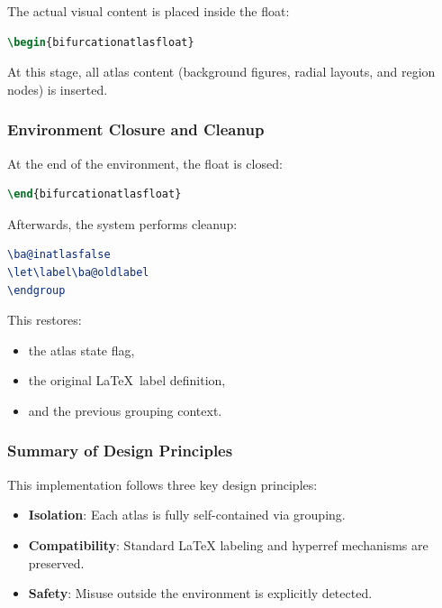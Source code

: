 The actual visual content is placed inside the float:

\begin{lstlisting}[language=LaTeX]
\begin{bifurcationatlasfloat}
\end{lstlisting}

At this stage, all atlas content (background figures, radial layouts, and region nodes) is inserted.

\subsubsection{Environment Closure and Cleanup}

At the end of the environment, the float is closed:

\begin{lstlisting}[language=LaTeX]
\end{bifurcationatlasfloat}
\end{lstlisting}

Afterwards, the system performs cleanup:

\begin{lstlisting}[language=LaTeX]
\ba@inatlasfalse
\let\label\ba@oldlabel
\endgroup
\end{lstlisting}

This restores:

\begin{itemize}
\item the atlas state flag,
\item the original \LaTeX\ label definition,
\item and the previous grouping context.
\end{itemize}

\subsubsection{Summary of Design Principles}

This implementation follows three key design principles:

\begin{itemize}
\item \textbf{Isolation}: Each atlas is fully self-contained via grouping.
\item \textbf{Compatibility}: Standard LaTeX labeling and hyperref mechanisms are preserved.
\item \textbf{Safety}: Misuse outside the environment is explicitly detected.
\end{itemize}


